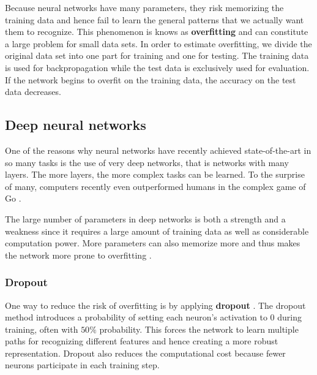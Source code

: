 Because neural networks have many parameters, they risk memorizing the training data and hence fail to learn the general patterns that we actually want them to recognize.
This phenomenon is knows as \textbf{overfitting} and can constitute a large problem for small data sets. In order to estimate overfitting, we divide the original data set into one part for training and one for testing. The training data is used for backpropagation while the test data is exclusively used for evaluation. If the network begins to overfit on the training data, the accuracy on the test data decreases.


\subsection{Deep neural networks}

One of the reasons why neural networks have recently achieved state-of-the-art in so many tasks is the use of very deep networks, that is networks with many layers.
The more layers, the more complex tasks can be learned. To the surprise of many, computers recently even outperformed humans in the complex game of Go \cite{AlphaGo, AlphaGoTuringTest}.

The large number of parameters in deep networks is both a strength and a weakness since it requires a large amount of training data as well as considerable computation power. More parameters can also memorize more and thus makes the network more prone to overfitting \cite{AlexNet}.

\subsubsection{Dropout}

One way to reduce the risk of overfitting is by applying \textbf{dropout}  \cite{AlexNet, FornesCnnCategorization}.
The dropout method introduces a probability of setting each neuron's activation to $0$ during training, often with $50\%$ probability. This forces the network to learn multiple paths for recognizing different features and hence creating a more robust representation. Dropout also reduces the computational cost because fewer neurons participate in each training step.

